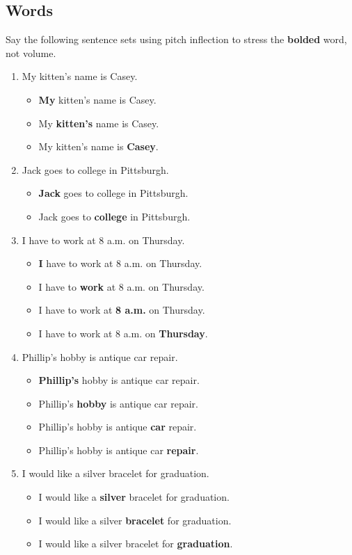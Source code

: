 \documentclass[12pt]{article}
\begin{document}
\subsection*{Words}
Say the following sentence sets using pitch inflection to stress the \textbf{bolded} word, not volume.
\begin{enumerate}
\item My kitten's name is Casey.
\begin{itemize}
\item \textbf{My} kitten's name is Casey.
\item My \textbf{kitten's} name is Casey.
\item My kitten's name is \textbf{Casey}.
\end{itemize}

\item Jack goes to college in Pittsburgh.
\begin{itemize}
\item \textbf{Jack} goes to college in Pittsburgh.
\item Jack goes to \textbf{college} in Pittsburgh.
\end{itemize}

\item I have to work at 8 a.m. on Thursday.
\begin{itemize}
\item \textbf{I} have to work at 8 a.m. on Thursday.
\item I have to \textbf{work} at 8 a.m. on Thursday.
\item I have to work at \textbf{8 a.m.} on Thursday.
\item I have to work at 8 a.m. on \textbf{Thursday}.
\end{itemize}

\item Phillip's hobby is antique car repair.
\begin{itemize}
\item \textbf{Phillip's} hobby is antique car repair.
\item Phillip's \textbf{hobby} is antique car repair.
\item Phillip's hobby is antique \textbf{car} repair.
\item Phillip's hobby is antique car \textbf{repair}.
\end{itemize}

\item I would like a silver bracelet for graduation.
\begin{itemize}
\item I would like a \textbf{silver} bracelet for graduation.
\item I would like a silver \textbf{bracelet} for graduation.
\item I would like a silver bracelet for \textbf{graduation}.
\end{itemize}


\end{enumerate}
\end{document}
